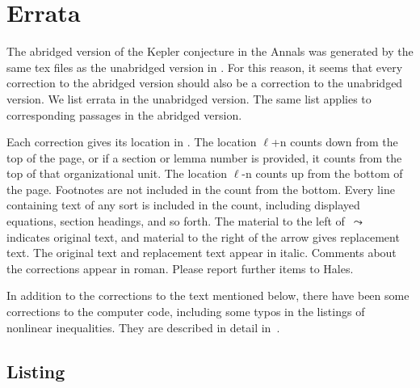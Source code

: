 \documentclass[11pt]{amsart}
\def\lto{\ensuremath{\,\leadsto\,}}
\def\line{$\ell$}
\begin{document}
\section{Errata}


The abridged version of the Kepler conjecture
in the Annals \cite{Hales:2005:Annals}
was generated by the same tex
files as the unabridged version in \cite{Hales:2006:DCG}.
For this reason,
it seems that every correction to
the abridged version should also be a correction to the unabridged version.
We list errata in the
unabridged version. The same list applies to corresponding 
passages in the abridged version.  



Each correction gives its location in \cite{Hales:2006:DCG}.
The location
\line+n counts down from the top of the page, or
if a section or lemma number is provided, it
counts from the top of that organizational unit.
The location \line-n counts up from the bottom
of the page. Footnotes are not included in the
count from the bottom.  Every line containing
text of any sort is included in the count,
including displayed equations, section headings,
and so forth.  The material to the left of $\lto$ 
indicates original text, and material to the right of the
arrow gives replacement text.  
The original text and replacement text appear in italic.
Comments about the corrections appear in roman. 
Please report further items to Hales.


In addition to the corrections to the text mentioned below, 
there have been some corrections to the computer code, including some typos in the
listings of nonlinear inequalities.
They are described in detail in~\cite{Hales:2008:Errata}.


\subsection*{Listing}\hfill\break
{}\baselineskip
\end{document}
